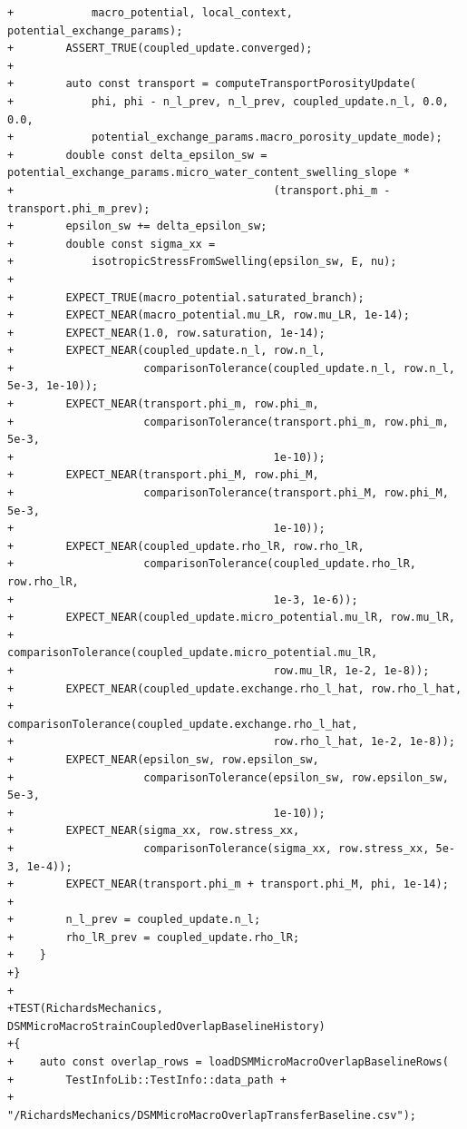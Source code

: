 \documentclass[10pt]{article}
\begin{document}
\begin{lstlisting}
+            macro_potential, local_context, potential_exchange_params);
+        ASSERT_TRUE(coupled_update.converged);
+
+        auto const transport = computeTransportPorosityUpdate(
+            phi, phi - n_l_prev, n_l_prev, coupled_update.n_l, 0.0, 0.0,
+            potential_exchange_params.macro_porosity_update_mode);
+        double const delta_epsilon_sw = potential_exchange_params.micro_water_content_swelling_slope *
+                                        (transport.phi_m - transport.phi_m_prev);
+        epsilon_sw += delta_epsilon_sw;
+        double const sigma_xx =
+            isotropicStressFromSwelling(epsilon_sw, E, nu);
+
+        EXPECT_TRUE(macro_potential.saturated_branch);
+        EXPECT_NEAR(macro_potential.mu_LR, row.mu_LR, 1e-14);
+        EXPECT_NEAR(1.0, row.saturation, 1e-14);
+        EXPECT_NEAR(coupled_update.n_l, row.n_l,
+                    comparisonTolerance(coupled_update.n_l, row.n_l, 5e-3, 1e-10));
+        EXPECT_NEAR(transport.phi_m, row.phi_m,
+                    comparisonTolerance(transport.phi_m, row.phi_m, 5e-3,
+                                        1e-10));
+        EXPECT_NEAR(transport.phi_M, row.phi_M,
+                    comparisonTolerance(transport.phi_M, row.phi_M, 5e-3,
+                                        1e-10));
+        EXPECT_NEAR(coupled_update.rho_lR, row.rho_lR,
+                    comparisonTolerance(coupled_update.rho_lR, row.rho_lR,
+                                        1e-3, 1e-6));
+        EXPECT_NEAR(coupled_update.micro_potential.mu_lR, row.mu_lR,
+                    comparisonTolerance(coupled_update.micro_potential.mu_lR,
+                                        row.mu_lR, 1e-2, 1e-8));
+        EXPECT_NEAR(coupled_update.exchange.rho_l_hat, row.rho_l_hat,
+                    comparisonTolerance(coupled_update.exchange.rho_l_hat,
+                                        row.rho_l_hat, 1e-2, 1e-8));
+        EXPECT_NEAR(epsilon_sw, row.epsilon_sw,
+                    comparisonTolerance(epsilon_sw, row.epsilon_sw, 5e-3,
+                                        1e-10));
+        EXPECT_NEAR(sigma_xx, row.stress_xx,
+                    comparisonTolerance(sigma_xx, row.stress_xx, 5e-3, 1e-4));
+        EXPECT_NEAR(transport.phi_m + transport.phi_M, phi, 1e-14);
+
+        n_l_prev = coupled_update.n_l;
+        rho_lR_prev = coupled_update.rho_lR;
+    }
+}
+
+TEST(RichardsMechanics, DSMMicroMacroStrainCoupledOverlapBaselineHistory)
+{
+    auto const overlap_rows = loadDSMMicroMacroOverlapBaselineRows(
+        TestInfoLib::TestInfo::data_path +
+        "/RichardsMechanics/DSMMicroMacroOverlapTransferBaseline.csv");

\end{lstlisting}
\end{document}
